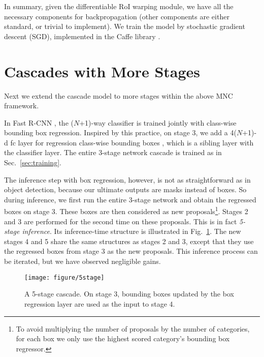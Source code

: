 \documentclass[10pt,twocolumn,letterpaper]{article}
\begin{document}
\vspace{1em}
In summary, given the differentiable RoI warping module, we have all the necessary components for backpropagation (other components are either standard, or trivial to implement). We train the model by stochastic gradient descent (SGD), implemented in the Caffe library \cite{Jia2014}.

\section{Cascades with More Stages}
\label{sec:morestages}

Next we extend the cascade model to more stages within the above MNC framework.

In Fast R-CNN \cite{Girshick2015}, the ($N$+1)-way classifier is trained jointly with class-wise bounding box regression. Inspired by this practice, on stage 3, we add a 4($N$+1)-d fc layer for regression class-wise bounding boxes \cite{Girshick2015}, which is a sibling layer with the classifier layer. The entire 3-stage network cascade is trained as in Sec.~\ref{sec:training}.

The inference step with box regression, however, is not as straightforward as in object detection, because our ultimate outputs are masks instead of boxes. So during inference, we first run the entire 3-stage network and obtain the regressed boxes on stage 3. These boxes are then considered as new proposals\footnote{To avoid multiplying the number of proposals by the number of categories, for each box we only use the highest scored category's bounding box regressor.}.
Stages 2 and 3 are performed for the second time on these proposals.
This is in fact \emph{5-stage inference}. Its inference-time structure is illustrated in Fig.~\ref{fig:5stage}. The new stages 4 and 5 share the same structures as stages 2 and 3, except that they use the regressed boxes from stage 3 as the new proposals. This inference process can be iterated, but we have observed negligible gains.

\begin{figure}
\begin{center}
\texttt{[image: figure/5stage]}
\end{center}
\vspace{-1em}
\caption{A 5-stage cascade. On stage 3, bounding boxes updated by the box regression layer are used as the input to stage 4.}
\label{fig:5stage}
\end{figure}
\end{document}
